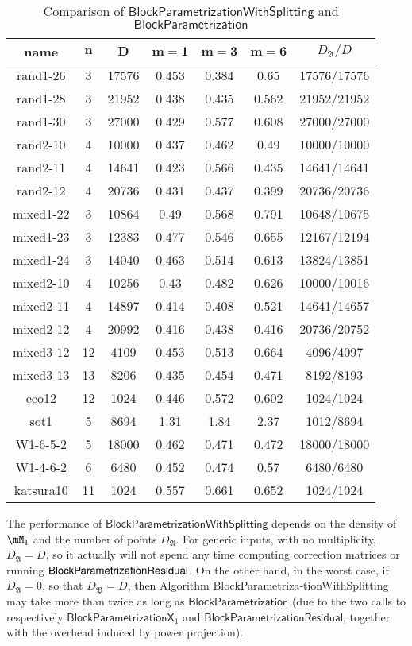 \documentclass[final,1p,times,authoryear]{elsarticle}
\newcommand{\mainalgoname}{\mathsf{ BlockParametrization}}
\begin{document}
\begin{table}[ht]
  \centering
  \setlength\tabcolsep{6pt}
  \caption{Comparison of $\mathsf{BlockParametrizationWithSplitting}$ and $\mainalgoname$}
  \label{tbl:comparison_algos}
  \begin{tabular}{c|c|c|c|c|c|c}
    \textbf{name}& $\bm{n}$ & $\bm{D}$ & $\bm{m = 1}$ & $\bm{m = 3}$ & $\bm{m = 6}$&$D_\mathfrak{A}/D$\\
    \hline
    rand1-26&3 &17576&0.453&0.384&0.65&17576/17576 \\
    rand1-28&3 &21952&0.438&0.435&0.562& 21952/21952\\
    rand1-30&3 &27000&0.429&0.577&0.608&27000/27000 \\
    rand2-10&4 &10000&0.437&0.462&0.49& 10000/10000\\
    rand2-11&4 &14641&0.423&0.566&0.435&14641/14641 \\
    rand2-12&4 &20736&0.431&0.437&0.399&20736/20736 \\
    mixed1-22&3 &10864&0.49&0.568&0.791& 10648/10675\\
    mixed1-23&3 &12383&0.477&0.546&0.655& 12167/12194\\
    mixed1-24&3 &14040&0.463&0.514&0.613& 13824/13851\\
    mixed2-10&4 &10256&0.43&0.482&0.626& 10000/10016\\
    mixed2-11&4 &14897&0.414&0.408&0.521& 14641/14657\\
    mixed2-12&4 &20992&0.416&0.438&0.416&20736/20752 \\
    mixed3-12&12 &4109&0.453&0.513&0.664& 4096/4097\\
    mixed3-13&13 &8206&0.435&0.454&0.471& 8192/8193\\
    eco12&12 &1024&0.446&0.572&0.602& 1024/1024\\
    sot1&5 &8694&1.31&1.84&2.37& 1012/8694\\
    W1-6-5-2&5 &18000&0.462&0.471&0.472& 18000/18000\\
    W1-4-6-2&6 &6480&0.452&0.474&0.57& 6480/6480\\
    katsura10&11 &1024&0.557&0.661&0.652& 1024/1024
  \end{tabular}
\end{table}

The performance of $\mathsf{BlockParametrizationWithSplitting}$
depends on the density of $\mM_1$ and the number of points
$D_\mathfrak{A}$. For generic inputs, with no multiplicity,
$D_\mathfrak{A}=D$, so it actually will not spend any time
computing correction matrices or running $\mainalgoname{\sf
Residual}$. On the other hand, in the worst case, if
$D_\mathfrak{A}=0$, so that $D_\mathfrak{B}=D$, then Algorithm
{\sf BlockParametriza}{\sf -tionWithSplitting} may take more than twice as
long as $\mainalgoname$ (due to the two calls to respectively
$\mathsf{BlockParametrizationX}_1$ and
$\mathsf{BlockParametrizationResidual}$, together with the overhead induced 
by power projection).
\end{document}
